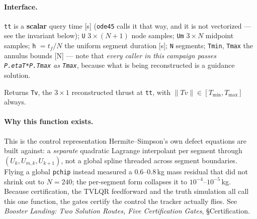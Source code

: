 \documentclass[11pt]{article}
\newcommand{\thenote}{\emph{Booster Landing: Two Solution Routes, Five
Certification Gates}}
\newcommand{\noteS}[1]{\thenote, \S#1}
\newcommand{\Tmin}{T_{\min}}
\newcommand{\Tmax}{T_{\max}}
\begin{document}
\paragraph{Interface.} \texttt{tt} is a \textbf{scalar} query time [s]
(\texttt{ode45} calls it that way, and it is not vectorized --- see the
invariant below); \texttt{U} $3\times(N{+}1)$ node samples; \texttt{Um}
$3\times N$ midpoint samples; \texttt{h} $= t_f/N$ the uniform segment
duration [s]; \texttt{N} segments; \texttt{Tmin}, \texttt{Tmax} the annulus
bounds [N] --- note that \emph{every caller in this campaign passes
\texttt{P.etaT*P.Tmax} as \texttt{Tmax}}, because what is being
reconstructed is a guidance solution.

Returns \texttt{Tv}, the $3\times1$ reconstructed thrust at \texttt{tt},
with $\lVert Tv\rVert \in [\Tmin, \Tmax]$ always.

\paragraph{Why this function exists.} This is the control representation
Hermite--Simpson's own defect equations are built against: a \emph{separate}
quadratic Lagrange interpolant per segment through $(U_k, U_{m,k},
U_{k+1})$, not a global spline threaded across segment boundaries. Flying a
global \texttt{pchip} instead measured a $0.6$--$0.8$\,kg mass residual that
did not shrink out to $N=240$; the per-segment form collapses it to
$10^{-4}$--$10^{-5}$\,kg. Because certification, the TVLQR feedforward and
the truth simulation all call this one function, the gates certify the
control the tracker actually flies. See \noteS{Certification}.
\end{document}
